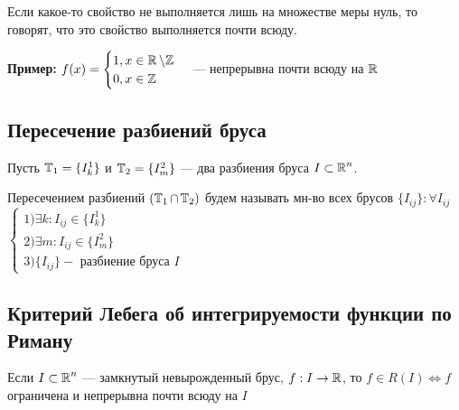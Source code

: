 \documentclass[a4paper, 10pt]{article}
\begin{document}
 Если какое-то свойство не выполняется лишь на множестве меры нуль, то говорят, что это свойство выполняется почти всюду.

\textbf{Пример:} $f(x) = \begin{cases}
        1, x \in \operatorname{\mathbb{R}}\backslash \mathbb{Z}\\
        0, x \in \mathbb{Z}
    \end{cases}$ --- непрерывна почти всюду на $\operatorname{\mathbb{R}}$

\subsection{Пересечение разбиений бруса}
 Пусть $\operatorname{\mathbb{T}}_1 = \{I^1_k\}$ и $\operatorname{\mathbb{T}}_2 = \{I^2_m\}$ — два разбиения бруса $I \subset \operatorname{\mathbb{R}}^n$. 

Пересечением разбиений $(\operatorname{\mathbb{T}}_1 \cap \operatorname{\mathbb{T}}_2)$ будем называть мн-во всех брусов $\{I_{ij}\}: \forall I_{ij}$
$\begin{cases}
    1) \exists k: I_{ij} \in \{I^1_k\}\\
    2) \exists m: I_{ij} \in \{I^2_m\}\\
    3) \{I_{ij}\} - \text{ разбиение бруса } I   
\end{cases}$

\subsection{Критерий Лебега об интегрируемости функции по Риману}
\theorem Если $I\subset \operatorname{\mathbb{R}}^n$ — замкнутый невырожденный брус, $f: I\to\operatorname{\mathbb{R}}$, то $f\in R(I) \iff f$ ограничена и непрерывна почти всюду на $I$
\end{document}
